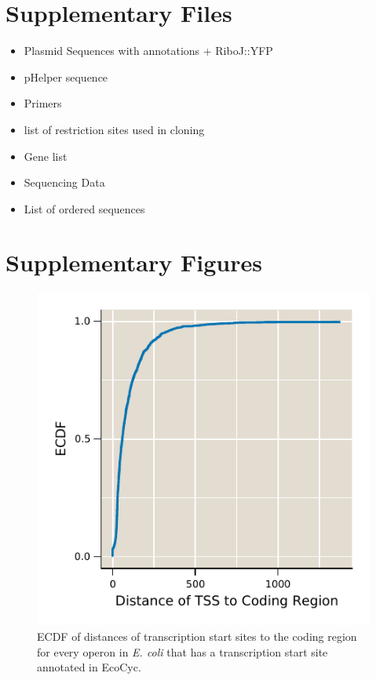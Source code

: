 \section{Supplementary Files}
\label{sec:SI_files}
\begin{itemize}
    \item Plasmid Sequences with annotations + RiboJ::YFP
    \item pHelper sequence
    \item Primers
    \item list of restriction sites used in cloning
    \item Gene list
    \item Sequencing Data
    \item List of ordered sequences
\end{itemize}

\clearpage

\section*{Supplementary Figures}
\begin{figure}[H]
    \centering
    \includegraphics{../figures/tss_CR_distance.pdf}
    \caption{ECDF of distances of transcription start sites to the coding region for every operon in \textit{E. coli} that has a transcription start site annotated in EcoCyc. }
    \label{fig:tss_distance}
\end{figure}


